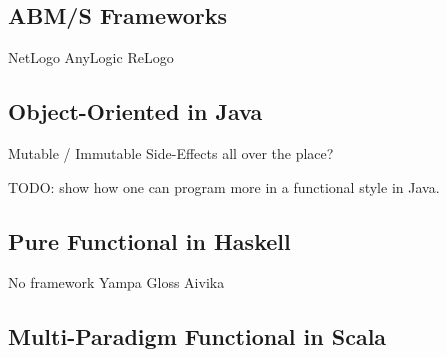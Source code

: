 \subsection{ABM/S Frameworks}
NetLogo
AnyLogic
ReLogo

\subsection{Object-Oriented in Java}
Mutable / Immutable
Side-Effects all over the place?

TODO: show how one can program more in a functional style in Java.

\subsection{Pure Functional in Haskell}
No framework
Yampa
Gloss
Aivika

\subsection{Multi-Paradigm Functional in Scala}
